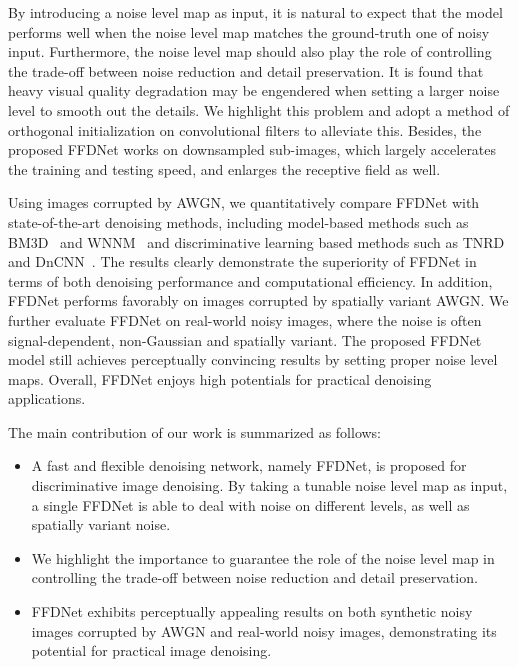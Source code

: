 \documentclass[journal]{IEEEtran}
\begin{document}
By introducing a noise level map as input, it is natural to expect that the model performs well when the noise level map matches the ground-truth one of noisy input.
Furthermore, the noise level map should also play the role of controlling the trade-off between noise reduction and detail preservation.
It is found that heavy visual quality degradation may be engendered when setting a larger noise level to smooth out the details.
We highlight this problem and adopt a method of orthogonal initialization on convolutional filters to alleviate this.
Besides, the proposed FFDNet works on downsampled sub-images, which largely accelerates the training and testing speed, and enlarges the receptive field as well.


Using images corrupted by AWGN, we quantitatively compare FFDNet with state-of-the-art denoising methods, including model-based methods such as BM3D~\cite{dabov2007image} and WNNM~\cite{gu2014weighted} and discriminative learning based methods such as TNRD~\cite{chen2015trainable} and DnCNN~\cite{zhang2017beyond}.
The results clearly demonstrate the superiority of FFDNet in terms of both denoising performance and computational efficiency. In addition, FFDNet performs favorably on images corrupted by spatially variant AWGN. We further evaluate FFDNet on real-world noisy images, where the noise is often signal-dependent, non-Gaussian and spatially variant. The proposed FFDNet model still achieves perceptually convincing results by setting proper noise level maps. Overall, FFDNet enjoys high potentials for practical denoising applications.


The main contribution of our work is summarized as follows:
\begin{itemize}

\item A fast and flexible denoising network, namely FFDNet, is proposed for discriminative image denoising. By taking a tunable noise level map as input, a single FFDNet is able to deal with noise on different levels, as well as spatially variant noise.

\item We highlight the importance to guarantee the role of the noise level map in controlling the trade-off between noise reduction and detail preservation.

\item FFDNet exhibits perceptually appealing results on both synthetic noisy images corrupted by AWGN and real-world noisy images, demonstrating its potential for practical image denoising.

\end{itemize}
\end{document}
